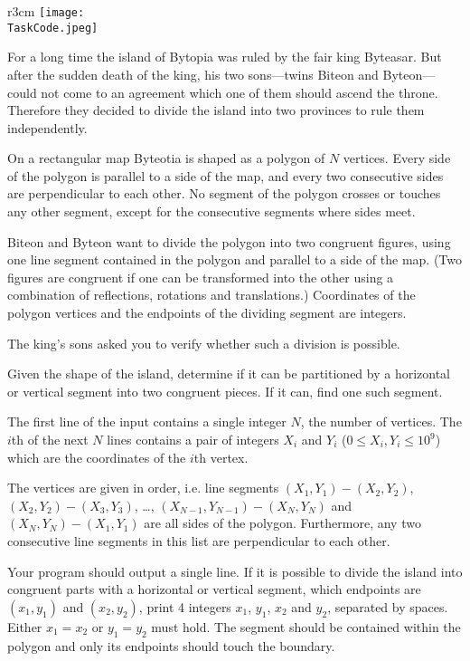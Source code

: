 \documentclass{boi2014}
\renewcommand{\TaskCode}{demarcation}
\begin{document}
    \begin{wrapfigure}{r}{3cm}
        \vspace{-24pt}
		\texttt{[image: \\TaskCode.jpeg]}
	\end{wrapfigure}

    For a long time the island of Bytopia was ruled by the fair king
    Byteasar. But after the sudden death
    of the king, his two sons---twins Biteon and Byteon---could
    not come to an agreement which one of them should ascend the throne.
    Therefore they decided to divide the island into two provinces to
    rule them independently.  
 
    On a rectangular map Byteotia is shaped as a polygon of $N$ vertices.  Every
    side of the polygon is parallel to a side of the map, and every two
    consecutive sides are perpendicular to each other. No segment of the polygon
    crosses or touches any other segment, except for the consecutive segments
    where sides meet.
    
    Biteon and Byteon want to divide the polygon into two congruent figures,
    using one line segment contained in the polygon and parallel to a side of
    the map.  (Two figures are congruent if one can be transformed into the
    other using a combination of reflections, rotations and translations.)
    Coordinates of the polygon vertices and the endpoints of the dividing
    segment are integers.  
 
    The king's sons asked you to verify whether such a division is
    possible.

    \Task
    Given the shape of the island, determine if it can be partitioned
    by a horizontal or vertical segment into two congruent pieces. If
    it can, find one such segment.
    
    \Input
    The first line of the input contains a single integer $N$, the number of
    vertices. The $i$th of the next $N$ lines contains a pair of integers $X_i$
    and $Y_i$ ($0 \le X_i, Y_i \le 10^9$) which are the coordinates of the $i$th
    vertex.

    The vertices are given in order, i.e. line segments $(X_1,Y_1) - (X_2,Y_2)$,
    $(X_2,Y_2) - (X_3,Y_3)$, \ldots, $(X_{N-1},Y_{N-1}) - (X_N,Y_N)$ and
    $(X_N,Y_N) - (X_1,Y_1)$ are all sides of the polygon.
    Furthermore, any two consecutive line segments in this list are
    perpendicular to each other.

	\Output
	Your program should output a single line. If it is possible to divide the
	island into congruent parts with a horizontal or vertical segment, which
	endpoints are $(x_1, y_1)$ and $(x_2, y_2)$, print 4 integers $x_1$,
	$y_1$, $x_2$ and $y_2$, separated by spaces.
	Either $x_1 = x_2$ or $y_1 = y_2$ must hold.
    The segment should be contained within the polygon and only its endpoints
    should touch the boundary.
\end{document}
